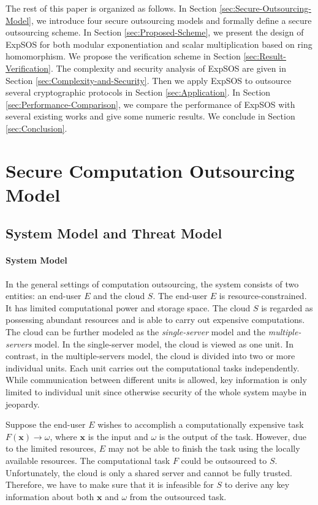 \documentclass[english,draftcls,onecolumn,11pt]{IEEEtran}
\theoremstyle{definition}
\theoremstyle{plain}
\theoremstyle{plain}
\theoremstyle{definition}
\begin{document}
The rest of this paper is organized as follows. In Section \ref{sec:Secure-Outsourcing-Model},
we introduce four secure outsourcing models and formally define a
secure outsourcing scheme. In Section \ref{sec:Proposed-Scheme},
we present the design of ExpSOS for both modular exponentiation and
scalar multiplication based on ring homomorphism. We propose the verification
scheme in Section \ref{sec:Result-Verification}. The complexity and
security analysis of ExpSOS are given in Section \ref{sec:Complexity-and-Security}.
Then we apply ExpSOS to outsource several cryptographic protocols
in Section \ref{sec:Application}. In Section \ref{sec:Performance-Comparison},
we compare the performance of ExpSOS with several existing works and
give some numeric results. We conclude in Section \ref{sec:Conclusion}.


\section{Secure Computation Outsourcing Model\label{sec:Secure-Outsourcing-Model}}


\subsection{System Model and Threat Model}


\paragraph{System Model}

In the general settings of computation outsourcing, the system consists
of two entities: an end-user $E$ and the cloud $S$. The end-user
$E$ is resource-constrained. It has limited computational power and
storage space. The cloud $S$ is regarded as possessing abundant resources
and is able to carry out expensive computations. The cloud can be
further modeled as the \textit{single-server} model and the \textit{multiple-servers}
model. In the single-server model, the cloud is viewed as one unit.
In contrast, in the multiple-servers model, the cloud is divided into
two or more individual units. Each unit carries out the computational
tasks independently. While communication between different units is
allowed, key information is only limited to individual unit since
otherwise security of the whole system maybe in jeopardy. 

Suppose the end-user $E$ wishes to accomplish a computationally expensive
task $F(\mathbf{x})\rightarrow\omega$, where $\mathbf{x}$ is the
input and $\omega$ is the output of the task. However, due to the
limited resources, $E$ may not be able to finish the task using the
locally available resources. The computational task $F$ could be
outsourced to $S$. Unfortunately, the cloud is only a shared server
and cannot be fully trusted. Therefore, we have to make sure that
it is infeasible for $S$ to derive any key information about both
$\mathbf{x}$ and $\omega$ from the outsourced task. 
\end{document}
